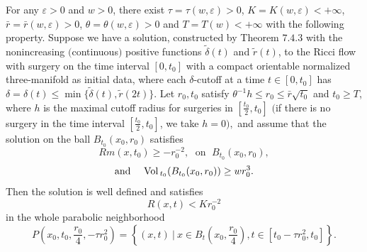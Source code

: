 \begin{theorem}
  \label{thm:cz-large-time-surgery-curvature-estimate}

For any $\varepsilon > 0$ and $w>0$, there exist
$\tau=\tau(w,\varepsilon)>0$, $K=K(w,\varepsilon)<+\infty$,
$\bar{r}=\bar{r}(w,\varepsilon)>0$,
$\theta=\theta(w,\varepsilon)>0$ and $T=T(w) < +\infty$ with the
following property. Suppose we have a solution, constructed by
Theorem $7.4.3$ with the nonincreasing $($continuous$)$ positive
functions $\widetilde{\delta}(t)$ and $\widetilde{r}(t)$, to the
Ricci flow with surgery on the time interval $[0,t_0]$ with a
compact orientable normalized three-manifold as initial data,
where each $\delta$-cutoff at a time $t \in [0,t_0]$ has
$\delta=\delta(t) \leq \min
\{\widetilde{\delta}(t),\widetilde{r}(2t)\}$. Let $r_0,t_0$
satisfy $\theta^{-1}h\leq r_0\leq \bar{r}\sqrt{t_0}$ and $t_0 \geq
T$, where $h$ is the maximal cutoff radius for surgeries in
$[\frac{t_0}{2},t_0]$ $($if there is no surgery in the time
interval $[\frac{t_0}{2},t_0]$, we take $h=0),$ and assume that
the solution on the ball $B_{t_0}(x_0,r_0)$ satisfies
$$
Rm(x,t_0) \geq -r^{-2}_0,\; \mbox{ on }\; B_{t_0}(x_0,r_0),
$$
$$
\mbox{and }\quad  {\rm Vol}\,_{t_0}(B_{t_0}(x_0,r_0)) \geq w r^3_0.
$$
Then the solution is well defined and satisfies
$$
R(x,t)<Kr^{-2}_0
$$
in the whole parabolic neighborhood
$$
P\left(x_0,t_0,\frac{r_0}{4},-\tau r^2_0\right) =\left\{(x,t)\ |\ x\in
B_t\left(x_0,\frac{r_0}{4}\right),t\in[t_0-\tau r^2_0,t_0]\right\}.
$$
\end{theorem}

